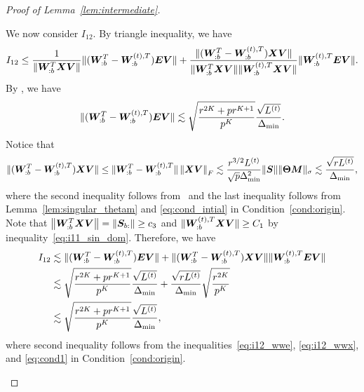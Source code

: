 \documentclass[lettersize,onecolumn,journal]{IEEEtran}
\theoremstyle{definition}
\theoremstyle{definition}
\begin{document}
\begin{proof}[Proof of Lemma~\ref{lem:intermediate}]
\begin{enumerate}[wide]
    
    
    We now consider $I_{12}$. By triangle inequality, we have 
    \begin{equation}
        I_{12} \leq \frac{1}{\lVert  \bm{W}_{:b}^T \bm X \bm{V} \rVert}\lVert (\bm{W}_{:b}^T - \bm{W}_{:b}^{(t),T}) \bm{E} \bm{V} \rVert + \frac{ \lVert(\bm{W}_{:b}^T - \bm{W}_{:b}^{(t),T}) \bm X \bm{V}\rVert }{\lVert  \bm{W}_{:b}^T \bm X \bm{V} \rVert \lVert  \bm{W}_{:b}^{(t),T} \bm X \bm{V} \rVert }\lVert \bm{W}_{:b}^{(t),T} \bm{E} \bm{V}\rVert.
    \end{equation}
    By \citet[Proof of Lemma 5]{han2020exact}, we have 
    \begin{equation}\label{eq:i12_wwe}
        \onormSize{}{ (\mW_{:b}^T - \mW_{:b}^{(t),T}) \mE \mV }  \lesssim \sqrt{\frac{ r^{2K} + p r^{K+1}}{p^K}} \frac{\sqrt{L^{(t)}}}{\Delta_{\min}}.
    \end{equation}
    Notice that 
    \begin{equation}\label{eq:i12_wwx}
        \onormSize{}{(\mW_{:b}^T - \mW_{:b}^{(t),T}) \mX \mV} \leq \onormSize{}{\mW_{:b}^T - \mW_{:b}^{(t),T}} \onorm{\mX\mV}_F \lesssim \frac{r^{3/2}L^{(t)}}{\sqrt{p}\Delta_{\min}^2} \onormSize{}{\mS} \onormSize{}{\mTheta \mM}_{\sigma} \lesssim \frac{ \sqrt{r L^{(t)}} }{\Delta_{\min}}, 
    \end{equation}
    where the second inequality follows from~\citet[Inequality (121), Proof of Lemma 5]{han2020exact} and the last inequality follows from Lemma~\ref{lem:singular_thetam} and \eqref{eq:cond_intial} in Condition~\ref{cond:origin}.
     Note that $\left\lVert\bm{W}_{:b}^T \bm X \bm{V}\right\rVert = \left\lVert\bm S_{b:}\right\rVert \geq c_3$ and $\lVert  \bm{W}_{:b}^{(t),T} \bm X \bm{V} \rVert \geq C_1$ by inequality~\eqref{eq:i11_sin_dom}. Therefore, we have 
     \begin{align}
         I_{12} &\lesssim  \onormSize{}{ (\mW_{:b}^T - \mW_{:b}^{(t),T}) \mE \mV }  +   \onormSize{}{(\mW_{:b}^T - \mW_{:b}^{(t),T}) \mX \mV}   \onormSize{}{ \mW_{:b}^{(t),T} \mE \mV} \\
         &\lesssim \sqrt{\frac{ r^{2K} + p r^{K+1}}{p^K}} \frac{\sqrt{L^{(t)}}}{\Delta_{\min}} + \frac{ \sqrt{r L^{(t)}} }{\Delta_{\min}}\sqrt{\frac{r^{2K}}{p^K}} \\
         & \lesssim \sqrt{\frac{ r^{2K} + p r^{K+1}}{p^K}} \frac{\sqrt{L^{(t)}}}{\Delta_{\min}},\label{eq:i12}
     \end{align}
     where second inequality follows from the inequalities~\eqref{eq:i12_wwe}, \eqref{eq:i12_wwx}, and \eqref{eq:cond1} in Condition~\ref{cond:origin}.
     

\end{enumerate}
\end{proof}
\end{document}
